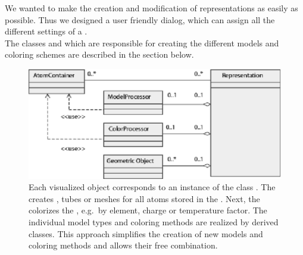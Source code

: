 We wanted to make the creation and modification of representations as easily as possible.
Thus we designed a user friendly dialog, which can assign all
the different settings of a .\\
The classes  and  which are responsible 
for creating the different models and coloring schemes are described in the
section below.
\begin{figure}[ht] %
\centering
\includegraphics[width=1.\textwidth]{representation.eps}
\caption[UML diagram for the  class]
{Each visualized object corresponds to an instance of the class 
. The  creates 
, \eg tubes or meshes for all atoms stored in the
. Next, the  colorizes the 
, e.g.\ by element, charge or temperature factor. The
individual model types and coloring methods are realized by derived classes.
This approach simplifies the creation of new models and coloring methods and 
allows their free combination.}
\label{fig:representation}
\end{figure}

